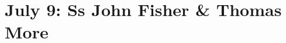 {
\section{July 9: Ss John Fisher \& Thomas More}
\subtitle{ Class}
\subtitle{I \& II Vespers}
\medskip

\def\deusinadjutoriumsolemn{F}
\def\vrlinebreak{F}
\def\preanttwo{\vspace{-0.5\baselineskip}}
\def\prepsalmthreeverses{\vspace{-0.1\baselineskip}}
\def\prerepeatantiphonthree{}
\def\prepsalmtitlefour{\vspace{-0.3\baselineskip}}
\def\prepsalmtitlefive{\vspace{-0.5\baselineskip}}
\def\begincollectcols{\begin{parcolumns}[rulebetween,colwidths={1=0.44\linewidth}]{2}}
\def\definevesperspropers{%
  
}
\def\definevesperspropersalt{
	
}
\def\vesperspropersnote{At II Vespers:}
\def\vesperspropersaltnote{At I Vespers:}
\def\prevesperspsalms{\noindent\printnote{Chapter and following, page \pageref{july9-chapter}.\\}}
\def\vesperspsalmslabel{\label{july9-2vespers}}
\def\prevesperspsalmsalt{\noindent\printnote{II Vespers psalms and antiphons, page \pageref{july9-2vespers}.}\medskip}
\def\prechapter{\label{july9-chapter}}

\bigskip
\benedicamusdomino{}
}